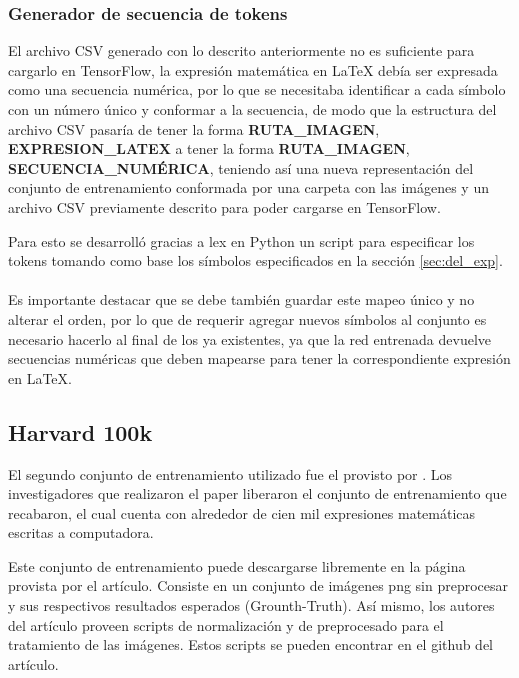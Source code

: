 \subsubsection{Generador de secuencia de tokens}
El archivo CSV generado con lo descrito anteriormente no es suficiente para cargarlo en TensorFlow, la expresión matemática en \LaTeX{} debía ser expresada como una secuencia numérica, por lo que se necesitaba identificar a cada símbolo con un número único y conformar a la secuencia, de modo que la estructura del archivo CSV pasaría de tener la forma \textbf{RUTA\_IMAGEN}, \textbf{EXPRESION\_LATEX} a tener la forma \textbf{RUTA\_IMAGEN}, \textbf{SECUENCIA\_NUMÉRICA}, teniendo así una nueva representación del conjunto de entrenamiento conformada por una carpeta con las imágenes y un archivo CSV previamente descrito para poder cargarse en TensorFlow.

Para esto se desarrolló gracias a lex en Python un script para especificar los tokens tomando como base los símbolos especificados en la sección \ref{sec:del_exp}.\\\\






\vspace{1em}
Es importante destacar que se debe también guardar este mapeo único y no alterar el orden, por lo que de requerir agregar nuevos símbolos al conjunto es necesario hacerlo al final de los ya existentes, ya que la red entrenada devuelve secuencias numéricas que deben mapearse para tener la correspondiente expresión en \LaTeX{}.

\subsection{Harvard 100k}

El segundo conjunto de entrenamiento utilizado fue el provisto por \cite{harvard}. Los investigadores que realizaron el paper liberaron el conjunto de entrenamiento que recabaron, el cual cuenta con alrededor de cien mil expresiones matemáticas escritas a computadora.

Este conjunto de entrenamiento puede descargarse libremente en la página provista por el artículo. Consiste en un conjunto de imágenes png sin preprocesar y sus respectivos resultados esperados (Grounth-Truth). Así mismo, los autores del artículo proveen scripts de normalización y de preprocesado para el tratamiento de las imágenes. Estos scripts se pueden encontrar en el github del artículo.

